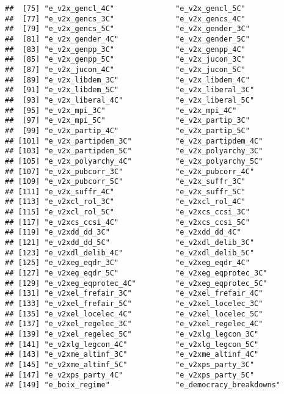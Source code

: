 \documentclass[
]{article}
\begin{document}
\begin{verbatim}
##  [75] "e_v2x_gencl_4C"              "e_v2x_gencl_5C"             
##  [77] "e_v2x_gencs_3C"              "e_v2x_gencs_4C"             
##  [79] "e_v2x_gencs_5C"              "e_v2x_gender_3C"            
##  [81] "e_v2x_gender_4C"             "e_v2x_gender_5C"            
##  [83] "e_v2x_genpp_3C"              "e_v2x_genpp_4C"             
##  [85] "e_v2x_genpp_5C"              "e_v2x_jucon_3C"             
##  [87] "e_v2x_jucon_4C"              "e_v2x_jucon_5C"             
##  [89] "e_v2x_libdem_3C"             "e_v2x_libdem_4C"            
##  [91] "e_v2x_libdem_5C"             "e_v2x_liberal_3C"           
##  [93] "e_v2x_liberal_4C"            "e_v2x_liberal_5C"           
##  [95] "e_v2x_mpi_3C"                "e_v2x_mpi_4C"               
##  [97] "e_v2x_mpi_5C"                "e_v2x_partip_3C"            
##  [99] "e_v2x_partip_4C"             "e_v2x_partip_5C"            
## [101] "e_v2x_partipdem_3C"          "e_v2x_partipdem_4C"         
## [103] "e_v2x_partipdem_5C"          "e_v2x_polyarchy_3C"         
## [105] "e_v2x_polyarchy_4C"          "e_v2x_polyarchy_5C"         
## [107] "e_v2x_pubcorr_3C"            "e_v2x_pubcorr_4C"           
## [109] "e_v2x_pubcorr_5C"            "e_v2x_suffr_3C"             
## [111] "e_v2x_suffr_4C"              "e_v2x_suffr_5C"             
## [113] "e_v2xcl_rol_3C"              "e_v2xcl_rol_4C"             
## [115] "e_v2xcl_rol_5C"              "e_v2xcs_ccsi_3C"            
## [117] "e_v2xcs_ccsi_4C"             "e_v2xcs_ccsi_5C"            
## [119] "e_v2xdd_dd_3C"               "e_v2xdd_dd_4C"              
## [121] "e_v2xdd_dd_5C"               "e_v2xdl_delib_3C"           
## [123] "e_v2xdl_delib_4C"            "e_v2xdl_delib_5C"           
## [125] "e_v2xeg_eqdr_3C"             "e_v2xeg_eqdr_4C"            
## [127] "e_v2xeg_eqdr_5C"             "e_v2xeg_eqprotec_3C"        
## [129] "e_v2xeg_eqprotec_4C"         "e_v2xeg_eqprotec_5C"        
## [131] "e_v2xel_frefair_3C"          "e_v2xel_frefair_4C"         
## [133] "e_v2xel_frefair_5C"          "e_v2xel_locelec_3C"         
## [135] "e_v2xel_locelec_4C"          "e_v2xel_locelec_5C"         
## [137] "e_v2xel_regelec_3C"          "e_v2xel_regelec_4C"         
## [139] "e_v2xel_regelec_5C"          "e_v2xlg_legcon_3C"          
## [141] "e_v2xlg_legcon_4C"           "e_v2xlg_legcon_5C"          
## [143] "e_v2xme_altinf_3C"           "e_v2xme_altinf_4C"          
## [145] "e_v2xme_altinf_5C"           "e_v2xps_party_3C"           
## [147] "e_v2xps_party_4C"            "e_v2xps_party_5C"           
## [149] "e_boix_regime"               "e_democracy_breakdowns"     

\end{verbatim}
\end{document}

